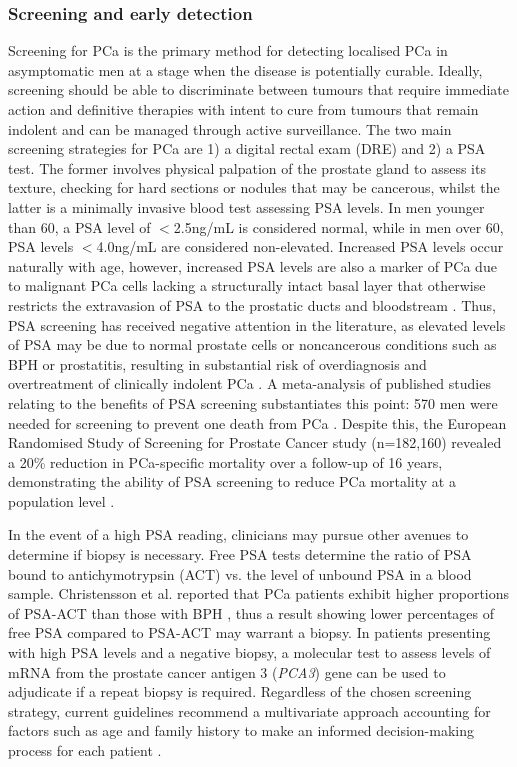 \subsubsection{Screening and early detection}
Screening for PCa is the primary method for detecting localised PCa in asymptomatic men at a stage when the disease is potentially curable. Ideally, screening should be able to discriminate between tumours that require immediate action and definitive therapies with intent to cure from tumours that remain indolent and can be managed through active surveillance. The two main screening strategies for PCa are 1) a digital rectal exam (DRE) and 2) a PSA test. The former involves physical palpation of the prostate gland to assess its texture, checking for hard sections or nodules that may be cancerous, whilst the latter is a minimally invasive blood test assessing PSA levels. In men younger than 60, a PSA level of $<$2.5ng/mL is considered normal, while in men over 60, PSA levels $<$4.0ng/mL are considered non-elevated. Increased PSA levels occur naturally with age, however, increased PSA levels are also a marker of PCa due to malignant PCa cells lacking a structurally intact basal layer that otherwise restricts the extravasion of PSA to the prostatic ducts and bloodstream \cite{David2024Sep}. Thus, PSA screening has received negative attention in the literature, as elevated levels of PSA may be due to normal prostate cells or noncancerous conditions such as BPH or prostatitis, resulting in substantial risk of overdiagnosis and overtreatment of clinically indolent PCa \cite{JuliaHayes2014Mar, Ilic2013Jan}. A meta-analysis of published studies relating to the benefits of PSA screening substantiates this point: 570 men were needed for screening to prevent one death from PCa \cite{Tesfai2024May}. Despite this, the European Randomised Study of Screening for Prostate Cancer study (n=182,160) revealed a 20\% reduction in PCa-specific mortality over a follow-up of 16 years, demonstrating the ability of PSA screening to reduce PCa mortality at a population level \cite{Hugosson2019Jul}. \par
In the event of a high PSA reading, clinicians may pursue other avenues to determine if biopsy is necessary. Free PSA tests determine the ratio of PSA bound to antichymotrypsin (ACT) vs. the level of unbound PSA in a blood sample. Christensson et al. reported that PCa patients exhibit higher proportions of PSA-ACT than those with BPH \cite{Christensson1993Jul}, thus a result showing lower percentages of free PSA compared to PSA-ACT may warrant a biopsy. In patients presenting with high PSA levels and a negative biopsy, a molecular test to assess levels of mRNA from the prostate cancer antigen 3 (\textit{PCA3}) gene can be used to adjudicate if a repeat biopsy is required. Regardless of the chosen screening strategy, current guidelines recommend a multivariate approach accounting for factors such as age and family history to make an informed decision-making process for each patient \cite{Mottet2017Apr}.

